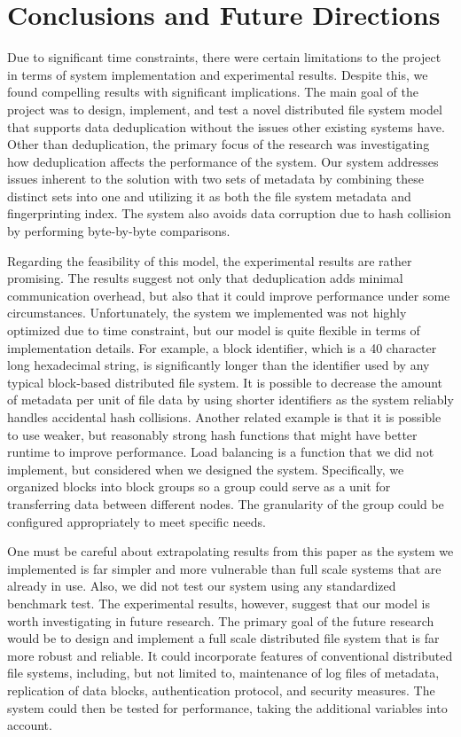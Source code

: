 \documentclass[11pt,twocolumn]{article}
\begin{document}
\section{Conclusions and Future Directions}\label{conc}
Due to significant time constraints, there were certain limitations to the project in terms of system implementation and experimental results. Despite this, we found compelling results with significant implications. The main goal of the project was to design, implement, and test a novel distributed file system model that supports data deduplication without the issues other existing systems have. Other than deduplication, the primary focus of the research was investigating how deduplication affects the performance of the system. Our system addresses issues inherent to the solution with two sets of metadata by combining these distinct sets into one and utilizing it as both the file system metadata and fingerprinting index. The system also avoids data corruption due to hash collision by performing byte-by-byte comparisons. 

Regarding the feasibility of this model, the experimental results are rather promising. The results suggest not only that deduplication adds minimal communication overhead, but also that it could improve performance under some circumstances. Unfortunately, the system we implemented was not highly optimized due to time constraint, but our model is quite flexible in terms of implementation details. For example, a block identifier, which is a 40 character long hexadecimal string, is significantly longer than the identifier used by any typical block-based distributed file system. It is possible to decrease the amount of metadata per unit of file data by using shorter identifiers as the system reliably handles accidental hash collisions. Another related example is that it is possible to use weaker, but reasonably strong hash functions that might have better runtime to improve performance. Load balancing is a function that we did not implement, but considered when we designed the system. Specifically, we organized blocks into block groups so a group could serve as a unit for transferring data between different nodes. The granularity of the group could be configured appropriately to meet specific needs.     

One must be careful about extrapolating results from this paper as the system we implemented is far simpler and more vulnerable than full scale systems that are already in use. Also, we did not test our system using any standardized benchmark test. The experimental results, however, suggest that our model is worth investigating in future research. The primary goal of the future research would be to design and implement a full scale distributed file system that is far more robust and reliable. It could incorporate features of conventional distributed file systems, including, but not limited to, maintenance of log files of metadata, replication of data blocks, authentication protocol, and security measures. The system could then be tested for performance, taking the additional variables into account. 
\end{document}
